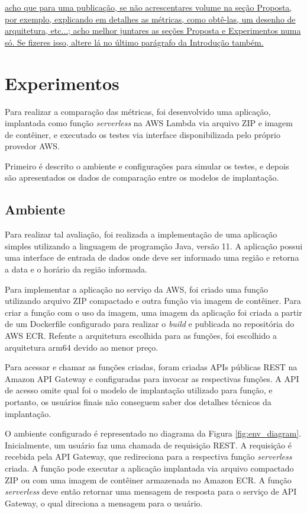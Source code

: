 \documentclass[conference]{IEEEtran}
\begin{document}
\ul{acho que para uma publicação, se não acrescentares volume na seção Proposta, por exemplo, explicando em detalhes as métricas, como obtê-las, um desenho de arquitetura, etc...; acho melhor juntares as seções Proposta e Experimentos numa só. Se fizeres isso, altere lá no último parágrafo da Introdução também.}

\section{Experimentos}
\label{sec:Resultados}

Para realizar a comparação das métricas, foi desenvolvido uma aplicação, implantada como função \textit{serverless} na AWS Lambda via arquivo ZIP e imagem de contêiner, e executado os testes via interface disponibilizada pelo próprio provedor AWS. 

Primeiro é descrito o ambiente e configurações para simular os testes, e depois são apresentados os dados de comparação entre os modelos de implantação.


\subsection{Ambiente}
\label{subsec:environment}

Para realizar tal avaliação, foi realizada a implementação de uma aplicação simples utilizando a linguagem de programção Java, versão 11. A aplicação possui uma interface de entrada de dados onde deve ser informado uma região e retorna a data e o horário da região informada.

Para implementar a aplicação no serviço da AWS, foi criado uma função utilizando arquivo ZIP compactado e outra função via imagem de contêiner. Para criar a função com o uso da imagem, uma imagem da aplicação foi criada a partir de um Dockerfile configurado para realizar o \textit{build} e publicada no repositória do AWS ECR. Refente a arquitetura escolhida para as funções, foi escolhido a arquitetura arm64 devido ao menor preço.

Para acessar e chamar as funções criadas, foram criadas APIs públicas REST na Amazon API Gateway e configuradas para invocar as respectivas funções. A API de acesso omite qual foi o modelo de implantação utilizado para função, e portanto, os usuários finais não conseguem saber dos detalhes técnicos da implantação.

O ambiente configurado é representado no diagrama da Figura \ref{fig:env_diagram}. Inicialmente, um usuário faz uma chamada de requisição REST. A requisição é recebida pela API Gateway, que redireciona para a respectiva função \textit{serverless} criada. A função pode executar a aplicação implantada via arquivo compactado ZIP ou com uma imagem de contêiner armazenada no Amazon ECR. A função \textit{serverless} deve então retornar uma mensagem de resposta para o serviço de API Gateway, o qual direciona a mensagem para o usuário.
\end{document}
